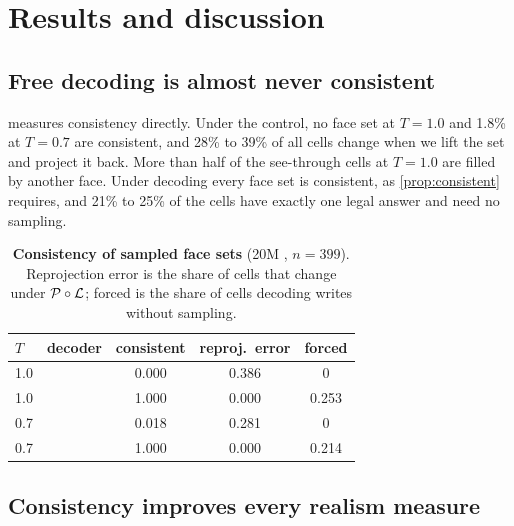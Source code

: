 \section{Results and discussion}
\label{sec:results}

\subsection{Free decoding is almost never consistent}
\label{sec:consistency}

 measures consistency directly. Under the \grammar{} control, no face set at
$T{=}1.0$ and 1.8\% at $T{=}0.7$ are consistent, and 28\% to 39\% of all cells change when we lift the
set and project it back. More than half of the see-through cells at $T{=}1.0$ are filled by another
face. Under \cfd{} decoding every face set is consistent, as \cref{prop:consistent} requires, and 21\%
to 25\% of the cells have exactly one legal answer and need no sampling.

\begin{table}[t]
  \centering
  \small
  \caption{\textbf{Consistency of sampled face sets} (20M \jointface{}, $n{=}399$). Reprojection error
  is the share of cells that change under $\mathcal{P}\circ\mathcal{L}$; forced is the share of cells \cfd{}
  decoding writes without sampling.}
  \label{tab:consistency}
  \begin{tabular}{@{}llccc@{}}
    \toprule
    $T$ & decoder & consistent & reproj.\ error & forced \\
    \midrule
    1.0 & \grammar{} & 0.000 & 0.386 & 0 \\
    1.0 & \cfd{}     & 1.000 & 0.000 & 0.253 \\
    0.7 & \grammar{} & 0.018 & 0.281 & 0 \\
    0.7 & \cfd{}     & 1.000 & 0.000 & 0.214 \\
    \bottomrule
  \end{tabular}
\end{table}

\subsection{Consistency improves every realism measure}
\label{sec:quality}

